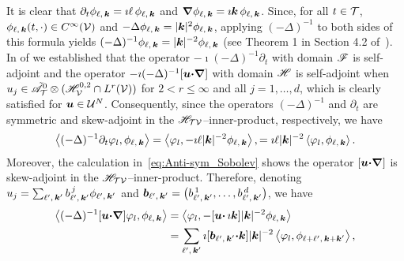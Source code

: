 \documentclass[amsa]{ipart}
\begin{document}
It is clear that
$\partial_t\phi_{\ell,\,\boldsymbol{k}}=\imath\ell\,\phi_{\ell,\,\boldsymbol{k}}$ and
$\mbox{\boldmath${\nabla}$}\phi_{\ell,\,\boldsymbol{k}}=\imath\boldsymbol{k}\,\phi_{\ell,\,\boldsymbol{k}}$. Since, for all $t\in\mathcal{T}$,
$\phi_{\ell,\,\boldsymbol{k}}(t,\cdot)\in C^\infty(\mathcal{V})$ and 
$-\Delta\phi_{\ell,\,\boldsymbol{k}}=|\boldsymbol{k}|^2\phi_{\ell,\,\boldsymbol{k}}$, applying $(-\Delta)^{-1}$ to both
sides of this formula yields
$(-\Delta)^{-1}\phi_{\ell,\,\boldsymbol{k}}=|\boldsymbol{k}|^{-2}\phi_{\ell,\,\boldsymbol{k}}$ (see Theorem 1 in
Section 4.2 of~\cite{McOwen:2003:PDE}). In 
of  we established that the operator
$-\imath(-\Delta)^{-1}\partial_t$ with domain $\mathscr{F}$ is self-adjoint and the operator
$-\imath(-\Delta)^{-1}[\boldsymbol{u}\mbox{\boldmath${\cdot}$}\mbox{\boldmath${\nabla}$}]$ with domain $\mathscr{H}$ is self-adjoint
when $u_j\in\tilde{\mathscr{A}}^0_{\mathcal{T}}\otimes(\mathscr{H}^{0,2}_{\mathcal{V}}\cap L^r(\mathcal{V}))$ for $2<r\leq\infty$ and all
$j=1,\ldots,d$, which is clearly satisfied for $\boldsymbol{u}\in\mathcal{U}^N$. Consequently,
since 
the operators $(-\Delta)^{-1}$ and $\partial_t$ are symmetric and skew-adjoint in
the $\mathscr{H}_{\mathcal{T}\mathcal{V}}$--inner-product, respectively, we have
%
\begin{align}\label{eq:Fourier_Del_Dt}
  \left\langle(-\Delta)^{-1}\partial_t\varphi_l,\phi_{\ell,\,\veck}\right\rangle
  =\left\langle\varphi_l,-\imath\ell|\veck|^{-2}\phi_{\ell,\,\veck}\right\rangle,
  =\imath\ell|\veck|^{-2}\left\langle\varphi_l,\phi_{\ell,\,\veck}\right\rangle.
\end{align}
%
Moreover, the calculation in~\eqref{eq:Anti-sym_Sobolev} shows the
operator $[\boldsymbol{u}\mbox{\boldmath${\cdot}$}\mbox{\boldmath${\nabla}$}]$ is skew-adjoint in the
$\mathscr{H}_{\mathcal{T}\mathcal{V}}$--inner-product. Therefore, denoting
$u_j=\sum_{\ell^\prime,\,\boldsymbol{k}^\prime}b^{\,j}_{\ell^\prime,\,\boldsymbol{k}^\prime}\phi_{\ell^\prime,\,\boldsymbol{k}^\prime}$ and
$\boldsymbol{b}_{\ell^\prime,\,\boldsymbol{k}^\prime}=\big(b^{\,1}_{\ell^\prime,\,\boldsymbol{k}^\prime},\ldots,b^{\,d}_{\ell^\prime,\,\boldsymbol{k}^\prime}\big)$, 
we have  
%
\begin{align}\label{eq:Fourier_Del_u_grad}   
  \left\langle(-\Delta)^{-1}[\vecu\bcdot\bnabla]\varphi_l,\phi_{\ell,\,\veck}\right\rangle
  &=\left\langle\varphi_l,-[\vecu\bcdot\,\imath\veck]|\veck|^{-2}\phi_{\ell,\,\veck}\right\rangle
  \\\notag
  &=\sum_{\ell^\prime,\,\veck^\prime}
  \imath[\vecb_{\ell^\prime,\,\veck^\prime}\bcdot\veck]|\veck|^{-2}
  \left\langle\varphi_l,\phi_{\ell+\ell^\prime,\,\veck+\veck^\prime}\right\rangle,
\end{align}
\end{document}
